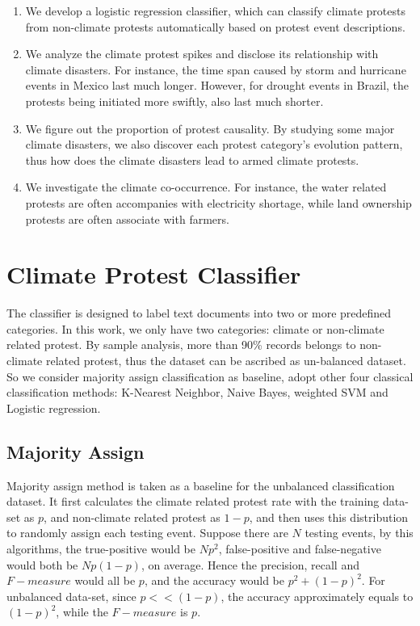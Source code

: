 \begin{enumerate}
  \item We develop a logistic regression classifier, which can classify climate protests from non-climate protests automatically based on protest event descriptions.
  \item We analyze the climate protest spikes and disclose its relationship with climate disasters. For instance, the time span caused by storm and hurricane events in Mexico last much longer. However, for drought events in Brazil, the protests being initiated more swiftly, also last much shorter.
  \item We figure out the proportion of protest causality. By studying some major climate disasters, we also discover each protest category's evolution pattern, thus how does the climate disasters lead to armed climate protests.
  \item We investigate the climate co-occurrence. For instance, the water related protests are often accompanies with electricity shortage, while land ownership protests are often associate with farmers.
\end{enumerate}
%

\section{Climate Protest Classifier}
The classifier is designed to label text documents into two or more predefined categories. In this work, we only have two categories: climate or non-climate related protest. By sample analysis, more than 90\% records belongs to non-climate related protest, thus the dataset can be ascribed as un-balanced dataset. So we consider majority assign classification as baseline, adopt other four classical classification methods: K-Nearest Neighbor, Naive Bayes, weighted SVM and Logistic regression.

\subsection{Majority Assign}
Majority assign method is taken as a baseline for the unbalanced classification dataset. It first calculates the climate related protest rate with the training data-set as $p$, and non-climate related protest as $1-p$, and then uses this distribution to randomly assign each testing event. Suppose there are $N$ testing events, by this algorithms, the true-positive would be $Np^2$, false-positive and false-negative would both be $Np(1-p)$, on average. Hence the precision, recall and $F-measure$ would all be $p$, and the accuracy would be $p^2+(1-p)^2$. For unbalanced data-set, since $p<<(1-p)$, the accuracy approximately equals to $(1-p)^2$, while the $F-measure$ is $p$.

